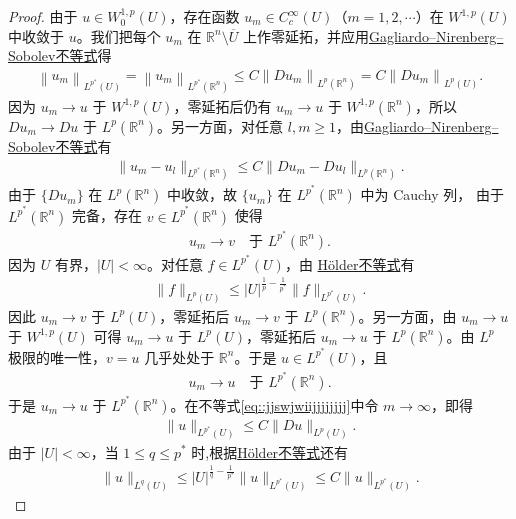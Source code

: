 \documentclass[../../main.tex]{subfiles}
\begin{document}
\begin{proof}
由于 $u\in W^{1,p}_{0}(U)$，存在函数 $u_{m}\in C^{\infty}_{c}(U)$（$m=1,2,\cdots$）在 $W^{1,p}(U)$ 中收敛于 $u$。我们把每个 $u_{m}$ 在 $\mathbb{R}^{n}\setminus\overline{U}$ 上作零延拓，并应用\hyperref[theorem:Gagliardo--Nirenberg--Sobolev不等式]{Gagliardo--Nirenberg--Sobolev不等式}得
\begin{align}\label{eq::jjswjwiijjjjjjjj}
\left\| u_m \right\| _{L^{p^*}\left( U \right)}=\left\| u_m \right\| _{L^{p^*}\left( \mathbb{R} ^n \right)}\leqslant C\left\| Du_m \right\| _{L^p\left( \mathbb{R} ^n \right)}=C\left\| Du_m \right\| _{L^p\left( U \right)}.
\end{align}
因为 $u_m\to u$ 于 $W^{1,p}(U)$，零延拓后仍有 $u_m\to u$ 于 $W^{1,p}(\mathbb{R}^n)$，所以 $Du_m\to Du$ 于 $L^{p}(\mathbb{R}^n)$。另一方面，对任意 $l,m\geqslant 1$，由\hyperref[theorem:Gagliardo--Nirenberg--Sobolev不等式]{Gagliardo--Nirenberg--Sobolev不等式}有
\begin{align*}
\|u_m-u_l\|_{L^{p^{*}}(\mathbb{R}^n)}\leqslant C\|Du_m-Du_l\|_{L^{p}(\mathbb{R}^n)}.
\end{align*}
由于 $\{Du_m\}$ 在 $L^{p}(\mathbb{R}^n)$ 中收敛，故 $\{u_m\}$ 在 $L^{p^{*}}(\mathbb{R}^n)$ 中为 Cauchy 列，
由于 $L^{p^*}(\mathbb{R}^n)$ 完备，存在 $v\in L^{p^*}(\mathbb{R}^n)$ 使得
\begin{align*}
u_m\to v \quad \text{于 } L^{p^*}(\mathbb{R}^n).
\end{align*}
因为 $U$ 有界，$|U|<\infty$。对任意 $f\in L^{p^*}(U)$，由 \hyperref[Real Analysis-theorem:实变函数--Hölder不等式]{Hölder不等式}有
\begin{align*}
\|f\|_{L^p(U)}\leqslant |U|^{\frac{1}{p}-\frac{1}{p^*}}\|f\|_{L^{p^*}(U)}.
\end{align*}
因此 $u_m\to v$ 于 $L^p(U)$，零延拓后 $u_m\to v$ 于 $L^p(\mathbb{R}^n)$。另一方面，由 $u_m\to u$ 于 $W^{1,p}(U)$ 可得 $u_m\to u$ 于 $L^p(U)$，零延拓后 $u_m\to u$ 于 $L^p(\mathbb{R}^n)$。由 $L^p$ 极限的唯一性，$v=u$ 几乎处处于 $\mathbb{R}^n$。于是 $u\in L^{p^*}(U)$，且
\begin{align*}
u_m\to u \quad \text{于 } L^{p^*}(\mathbb{R}^n).
\end{align*}
于是 $u_m\to u$ 于 $L^{p^{*}}(\mathbb{R}^n)$。在不等式\eqref{eq::jjswjwiijjjjjjjj}中令 $m\to\infty$，即得
\begin{align*}
\|u\|_{L^{p^{*}}(U)}\leqslant C\|Du\|_{L^{p}(U)}.
\end{align*}
由于 $|U|<\infty$，当 $1\leqslant q\leqslant p^{*}$ 时,根据\hyperref[Real Analysis-theorem:实变函数--Hölder不等式]{Hölder不等式}还有
\begin{align*}
\|u\|_{L^{q}(U)}\leqslant |U|^{\frac{1}{q}-\frac{1}{p^{*}}}\|u\|_{L^{p^{*}}(U)}\leqslant C\|u\|_{L^{p^{*}}(U)}.
\end{align*}
\end{proof}
\end{document}

